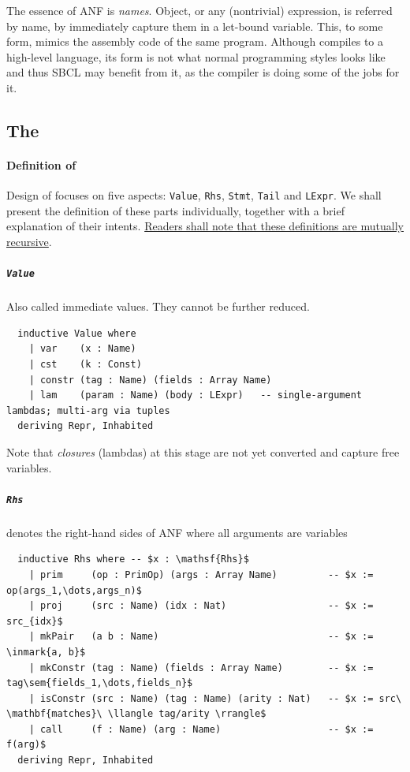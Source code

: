 \documentclass[a4paper, 11pt]{article}
\theoremstyle{remark}\newtheorem*{remark}{Remark}
\theoremstyle{definition}\newtheorem*{definition}{Definition}
\begin{document}
The essence of ANF is \emph{names}. Object, or any (nontrivial) expression, is referred by name, by
immediately capture them in a let-bound variable. This, to some form, mimics the assembly code of
the same program. Although \Tigris compiles to a high-level language, its form is not what normal
programming styles looks like and thus SBCL may benefit from it, as the \Tigris compiler
is doing some of the jobs for it.

\subsection{The \Lambdair}
\paragraph{Definition of \Lambdair}
Design of \Lambdair focuses on five aspects: \texttt{Value}, \texttt{Rhs}, \texttt{Stmt}, \texttt{Tail}
and \texttt{LExpr}. We shall present the definition of these parts individually, together with a brief explanation of
their intents. \underline{Readers shall note that these definitions are mutually recursive}.

\subparagraph{\texttt{Value}} Also called immediate values. They cannot be further reduced.
\begin{verbatim}
  inductive Value where
    | var    (x : Name)
    | cst    (k : Const)
    | constr (tag : Name) (fields : Array Name)
    | lam    (param : Name) (body : LExpr)   -- single-argument lambdas; multi-arg via tuples
  deriving Repr, Inhabited
\end{verbatim}
Note that \emph{closures} (lambdas) at this stage are not yet converted and capture free variables.

\subparagraph{\texttt{Rhs}} denotes the right-hand sides of ANF where all arguments are variables
\begin{verbatim}
  inductive Rhs where -- $x : \mathsf{Rhs}$
    | prim     (op : PrimOp) (args : Array Name)         -- $x := op(args_1,\dots,args_n)$
    | proj     (src : Name) (idx : Nat)                  -- $x := src_{idx}$
    | mkPair   (a b : Name)                              -- $x := \inmark{a, b}$
    | mkConstr (tag : Name) (fields : Array Name)        -- $x := tag\sem{fields_1,\dots,fields_n}$
    | isConstr (src : Name) (tag : Name) (arity : Nat)   -- $x := src\ \mathbf{matches}\ \llangle tag/arity \rrangle$
    | call     (f : Name) (arg : Name)                   -- $x := f(arg)$
  deriving Repr, Inhabited
\end{verbatim}
\end{document}
